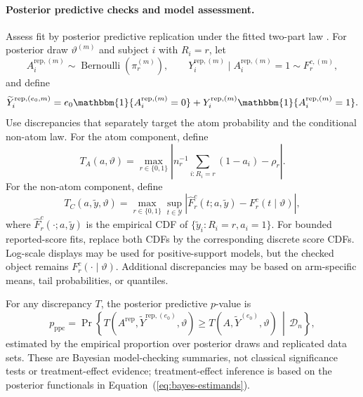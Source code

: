 \documentclass[11pt]{article}
\DeclareMathOperator*{\Bernoulli}{Bernoulli}
\begin{document}
\paragraph{Posterior predictive checks and model assessment.}
Assess fit by posterior predictive replication under the fitted two-part law \citep{gelman1996posterior}. For posterior draw $\vartheta^{(m)}$ and subject $i$ with $R_i=r$, let
\[
  A_i^{\mathrm{rep},(m)} \sim \Bernoulli\!\left(\pi_r^{(m)}\right),
  \qquad
  Y_i^{\mathrm{rep},(m)} \mid A_i^{\mathrm{rep},(m)}=1
  \sim F_r^{c,(m)},
\]
and define
\[
  \widetilde{Y}_i^{\mathrm{rep},(e_0,m)}
  =
  e_0\mathbbm{1}\{A_i^{\mathrm{rep},(m)}=0\}
  +
  Y_i^{\mathrm{rep},(m)}\mathbbm{1}\{A_i^{\mathrm{rep},(m)}=1\}.
\]
Use discrepancies that separately target the atom probability and the conditional non-atom law. For the atom component, define
\[
  T_A(a,\vartheta)
  =
  \max_{r\in\{0,1\}}
  \left|
    n_r^{-1}\sum_{i:R_i=r}(1-a_i)-\rho_r
  \right|.
\]
For the non-atom component, define
\[
  T_C(a,\widetilde y,\vartheta)
  =
  \max_{r\in\{0,1\}}
  \sup_{t\in\mathcal Y}
  \left|
    \widehat F_r^c(t;a,\widetilde y)-F_r^c(t\mid\vartheta)
  \right|,
\]
where $\widehat F_r^c(\cdot;a,\widetilde y)$ is the empirical CDF of $\{\widetilde y_i:R_i=r,a_i=1\}$. For bounded reported-score fits, replace both CDFs by the corresponding discrete score CDFs. Log-scale displays may be used for positive-support models, but the checked object remains $F_r^c(\cdot\mid\vartheta)$. Additional discrepancies may be based on arm-specific means, tail probabilities, or quantiles.

For any discrepancy $T$, the posterior predictive $p$-value is
\[
  p_{\mathrm{ppc}}
  =
  \Pr\!\left\{
    T(A^{\mathrm{rep}},\widetilde Y^{\mathrm{rep},(e_0)},\vartheta)
    \geq
    T(A,\widetilde Y^{(e_0)},\vartheta)
    \,\middle|\,
    \mathcal D_n
  \right\},
\]
estimated by the empirical proportion over posterior draws and replicated data sets. These are Bayesian model-checking summaries, not classical significance tests or treatment-effect evidence; treatment-effect inference is based on the posterior functionals in Equation~(\ref{eq:bayes-estimands}).
\end{document}
